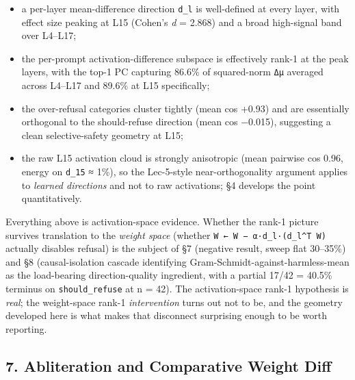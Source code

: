 \documentclass[
  11pt,
]{article}
\providecommand{\tightlist}{%
  \setlength{\itemsep}{0pt}\setlength{\parskip}{0pt}}
\begin{document}
\begin{itemize}
\tightlist
\item
  a per-layer mean-difference direction \texttt{d\_l} is well-defined at
  every layer, with effect size peaking at L15 (Cohen's \emph{d} =
  2.868) and a broad high-signal band over L4--L17;
\item
  the per-prompt activation-difference subspace is effectively rank-1 at
  the peak layers, with the top-1 PC capturing 86.6\% of squared-norm
  \texttt{Δμ} averaged across L4--L17 and 89.6\% at L15 specifically;
\item
  the over-refusal categories cluster tightly (mean cos +0.93) and are
  essentially orthogonal to the should-refuse direction (mean cos
  −0.015), suggesting a clean selective-safety geometry at L15;
\item
  the raw L15 activation cloud is strongly anisotropic (mean pairwise
  cos 0.96, energy on \texttt{d\_15} ≈ 1\%), so the Lec-5-style
  near-orthogonality argument applies to \emph{learned directions} and
  not to raw activations; §4 develops the point quantitatively.
\end{itemize}

Everything above is activation-space evidence. Whether the rank-1
picture survives translation to the \emph{weight space} (whether
\texttt{W\ ←\ W\ −\ α·d\_l·(d\_l\^{}T\ W)} actually disables refusal) is
the subject of §7 (negative result, sweep flat 30--35\%) and §8
(causal-isolation cascade identifying Gram-Schmidt-against-harmless-mean
as the load-bearing direction-quality ingredient, with a partial 17/42 =
40.5\% terminus on \texttt{should\_refuse} at n = 42). The
activation-space rank-1 hypothesis is \emph{real}; the weight-space
rank-1 \emph{intervention} turns out not to be, and the geometry
developed here is what makes that disconnect surprising enough to be
worth reporting.

\subsection{7. Abliteration and Comparative Weight
Diff}\label{abliteration-and-comparative-weight-diff}
\end{document}

